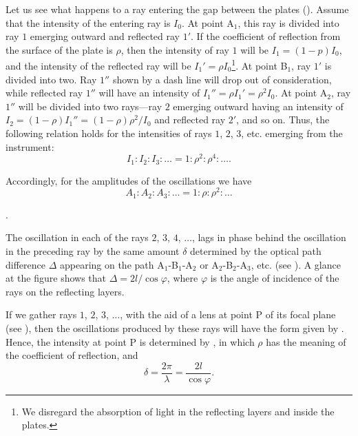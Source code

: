 Let us see what happens to a ray entering the gap between the plates ().
Assume that the intensity of the entering ray is $I_0$.
At point A$_1$, this ray is divided into ray $1$ emerging outward and reflected ray $1'$.
If the coefficient of reflection from the surface of the plate is $\rho$, then the intensity of ray $1$ will be $I_1=(1-p)I_0$, and the intensity of the reflected ray will be $I_1'=\rho I_0$\footnote{We disregard the absorption of light in the reflecting layers and inside the plates.}.
At point B$_1$, ray $1'$ is divided into two.
Ray $1''$ shown by a dash line will drop out of consideration, while reflected ray $1''$ will have an intensity of $I_1''=\rho I_1'=\rho^2I_0$.
At point A$_2$, ray $1''$ will be divided into two rays---ray $2$ emerging outward having an intensity of $I_2=(1-\rho)I_1''=(1-\rho)\rho^2/I_0$ and reflected ray $2'$, and so on.
Thus, the following relation holds for the intensities of rays $1$, $2$, $3$, etc. emerging
from the instrument:
\begin{equation*}
    I_1 : I_2 : I_3 : \ldots = 1 : \rho^2 : \rho^4 : \ldots .
\end{equation*}

\noindent
Accordingly, for the amplitudes of the oscillations we have
\begin{equation*}
    A_1 : A_2 : A_3 : \ldots = 1 : \rho : \rho^2 : \ldots
\end{equation*}

.

The oscillation in each of the rays $2$, $3$, $4$, $\ldots$, lags in phase behind the oscillation in the preceding ray by the same amount $\delta$ determined by the optical path difference $\Delta$ appearing on the path A$_1$-B$_1$-A$_2$ or A$_2$-B$_2$-A$_3$, etc. (see ).
A glance at the figure shows that $\Delta=2l/\cos\varphi$, where $\varphi$ is the angle of incidence of the rays on the reflecting layers.

If we gather rays $1$, $2$, $3$, $\ldots$, with the aid of a lens at point P of its focal plane (see ), then the oscillations produced by these rays will have the form given by .
Hence, the intensity at point P is determined by , in which $\rho$ has the meaning of the coefficient of reflection, and
\begin{equation*}
    \delta = \frac{2\pi}{\lambda} = \frac{2l}{\cos\varphi}.
\end{equation*}

